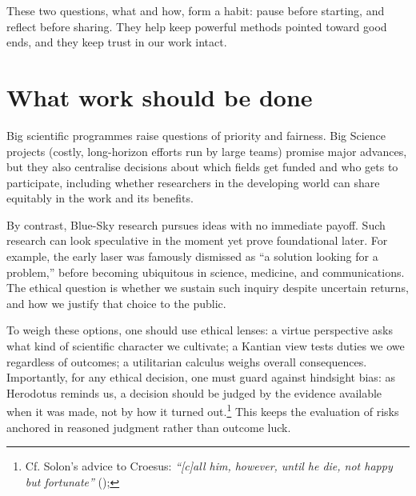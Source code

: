 \documentclass[
  a4paper,
  DIV=11,
  numbers=noendperiod,
  oneside]{scrreprt}
\begin{document}
These two questions, what and how, form a habit: pause before starting,
and reflect before sharing. They help keep powerful methods pointed
toward good ends, and they keep trust in our work intact.

\section{What work should be done}\label{what-work-should-be-done}

Big scientific programmes raise questions of priority and fairness. Big
Science projects (costly, long-horizon efforts run by large teams)
promise major advances, but they also centralise decisions about which
fields get funded and who gets to participate, including whether
researchers in the developing world can share equitably in the work and
its benefits.

By contrast, Blue-Sky research pursues ideas with no immediate payoff.
Such research can look speculative in the moment yet prove foundational
later. For example, the early laser was famously dismissed as ``a
solution looking for a problem,'' before becoming ubiquitous in science,
medicine, and communications. The ethical question is whether we sustain
such inquiry despite uncertain returns, and how we justify that choice
to the public.

To weigh these options, one should use ethical lenses: a virtue
perspective asks what kind of scientific character we cultivate; a
Kantian view tests duties we owe regardless of outcomes; a utilitarian
calculus weighs overall consequences. Importantly, for any ethical
decision, one must guard against hindsight bias: as Herodotus reminds
us, a decision should be judged by the evidence available when it was
made, not by how it turned out.\footnote{Cf. Solon's advice to Croesus:
  \emph{``{[}c{]}all him, however, until he die, not happy but
  fortunate''} ();} This keeps the evaluation of risks
anchored in reasoned judgment rather than outcome luck.
\end{document}
